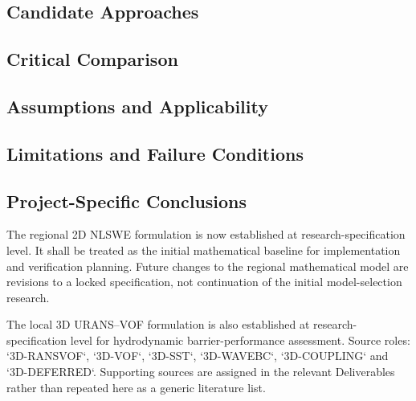 \subsection{Candidate Approaches}
\label{sec:res-mod-spec-candidate-approaches}


\subsection{Critical Comparison}
\label{sec:res-mod-spec-critical-comparison}


\subsection{Assumptions and Applicability}
\label{sec:res-mod-spec-assumptions}


\subsection{Limitations and Failure Conditions}
\label{sec:res-mod-spec-limitations}


\subsection{Project-Specific Conclusions}
\label{sec:res-mod-spec-conclusions}


The regional 2D NLSWE formulation is now established at
research-specification level. It shall be treated as the initial
mathematical baseline for implementation and verification planning.
Future changes to the regional mathematical model are revisions to a
locked specification, not continuation of the initial model-selection
research.

The local 3D URANS--VOF formulation is also established at
research-specification level for hydrodynamic barrier-performance
assessment. Source roles: `3D-RANSVOF`, `3D-VOF`, `3D-SST`,
`3D-WAVEBC`, `3D-COUPLING` and `3D-DEFERRED`. Supporting sources are
assigned in the relevant Deliverables rather than repeated here as a
generic literature list.

